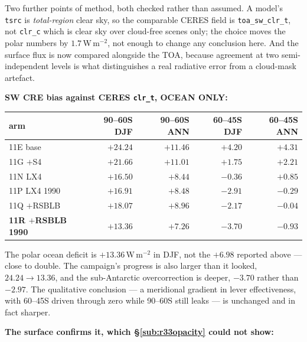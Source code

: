 \documentclass[10pt]{article}
\begin{document}
Two further points of method, both checked rather than assumed. A model's \texttt{tsrc} is
\emph{total-region} clear sky, so the comparable CERES field is \texttt{toa\_sw\_clr\_t},
not \texttt{clr\_c} which is clear sky over cloud-free scenes only; the choice moves the
polar numbers by $1.7$\,W\,m$^{-2}$, not enough to change any conclusion here. And the
surface flux is now compared alongside the TOA, because agreement at two semi-independent
levels is what distinguishes a real radiative error from a cloud-mask artefact.

\textbf{SW CRE bias against CERES \texttt{clr\_t}, OCEAN ONLY:}

\begin{center}\small
\begin{tabular}{lrrrr}
\toprule
arm & 90--60S DJF & 90--60S ANN & 60--45S DJF & 60--45S ANN \\
\midrule
11E base & $+24.24$ & $+11.46$ & $+4.20$ & $+4.31$ \\
11G $+$S4 & $+21.66$ & $+11.01$ & $+1.75$ & $+2.21$ \\
11N LX4 & $+16.50$ & $+8.44$ & $-0.36$ & $+0.85$ \\
11P LX4 1990 & $+16.91$ & $+8.48$ & $-2.91$ & $-0.29$ \\
11Q $+$RSBLB & $+18.07$ & $+8.96$ & $-2.17$ & $-0.04$ \\
\textbf{11R $+$RSBLB 1990} & $\mathbf{+13.36}$ & $\mathbf{+7.26}$ & $\mathbf{-3.70}$ & $\mathbf{-0.93}$ \\
\bottomrule
\end{tabular}
\end{center}

The polar ocean deficit is $\mathbf{+13.36}$\,W\,m$^{-2}$ in DJF, not the $+6.98$ reported
above --- close to double. The campaign's progress is also larger than it looked,
$24.24\to13.36$, and the sub-Antarctic overcorrection is deeper, $-3.70$ rather than
$-2.97$. The qualitative conclusion --- a meridional gradient in lever effectiveness, with
60--45S driven through zero while 90--60S still leaks --- is unchanged and in fact
sharper.

\textbf{The surface confirms it, which \S\ref{sub:r33opacity} could not show:}
\end{document}
